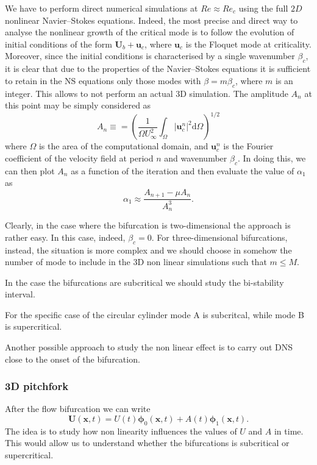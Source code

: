 \documentclass{jfm}
\begin{document}
We have to perform direct numerical simulations at $Re \approx Re_c$ using the full $2D$ nonlinear Navier--Stokes equations. Indeed, the most precise and direct way to analyse the nonlinear growth of the critical mode is to follow the evolution of initial conditions of the form $\bm{U}_b + \bm{u}_c$, where $\bm{u}_c$ is the Floquet mode at criticality. Moreover, since the initial conditions is characterised by a single wavenumber $\beta_c$, it is clear that due to the properties of the Navier--Stokes equations it is sufficient to retain in the NS equations only those modes with $\beta = m \beta_c$, where $m$ is an integer. This allows to not perform an actual 3D simulation.
The amplitude $A_n$ at this point may be simply considered as
%
\begin{equation}
  A_n \equiv =  \left( \frac{1}{\Omega U_\infty^2} \int_{\Omega} |\bm{u}^n_c|^2 \text{d} \Omega \right)^{1/2}
\end{equation}
%
where $\Omega$ is the area of the computational domain, and $\bm{u}^n_c$ is the Fourier coefficient of the velocity field at period $n$ and wavenumber $\beta_c$. In doing this, we can then plot $A_n$ as a function of the iteration and then evaluate the value of $\alpha_1$ as
%
\begin{equation}
  \alpha_1 \approx \frac{ A_{n+1} - \mu A_n}{A_n^3}.
\end{equation}
%

Clearly, in the case where the bifurcation is two-dimensional the approach is rather easy. In this case, indeed, $\beta_c = 0$. For three-dimensional bifurcations, instead, the situation is more complex and we should choose in somehow the number of mode to include in the 3D non linear simulations such that $m\le M$.

In the case the bifurcations are subcritical we should study the bi-stability interval.


For the specific case of the circular cylinder mode A is subcritcal, while mode B is supercritical.


Another possible approach to study the non linear effect is to carry out DNS close to the onset of the bifurcation.

\subsubsection{3D pitchfork}

After the flow bifurcation we can write
%
\begin{equation}
  \bm{U}(\bm{x},t) = U(t) \bm{\phi}_0(\bm{x},t) + A(t) \bm{\phi}_1(\bm{x},t).
\end{equation}
%
The idea is to study how non linearity influences the values of $U$ and $A$ in time. This would allow us to understand whether the bifurcations is subcritical or supercritical.
\end{document}

